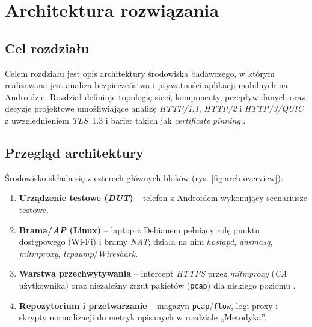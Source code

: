 \chapter{Architektura rozwiązania}

\section{Cel rozdziału}
Celem rozdziału jest opis architektury środowiska badawczego, w którym realizowana jest analiza bezpieczeństwa i prywatności aplikacji mobilnych na Androidzie. Rozdział definiuje topologię sieci, komponenty, przepływ danych oraz decyzje projektowe umożliwiające analizę \emph{HTTP/1.1}, \emph{HTTP/2} i \emph{HTTP/3/QUIC} z uwzględnieniem \emph{TLS}~1.3 i barier takich jak \emph{certificate pinning} \cite{RFC8446,RFC9113,RFC9114,RFC9000,OWASPMASTGIntercept,OWASPMASTGPinning}.

\section{Przegląd architektury}
Środowisko składa się z czterech głównych bloków (rys. \ref{fig:arch-overview}):
\begin{enumerate}
  \item \textbf{Urządzenie testowe (\emph{DUT})} – telefon z Androidem wykonujący scenariusze testowe.
  \item \textbf{Brama/\emph{AP} (Linux)} – laptop z Debianem pełniący rolę punktu dostępowego (Wi-Fi) i bramy \emph{NAT}; działa na nim \textit{hostapd}, \textit{dnsmasq}, \textit{mitmproxy}, \textit{tcpdump}/\textit{Wireshark}.
  \item \textbf{Warstwa przechwytywania} – intercept \emph{HTTPS} przez \textit{mitmproxy} (\emph{CA} użytkownika) oraz niezależny zrzut pakietów (\texttt{pcap}) dla niskiego poziomu \cite{MitmproxyDocs,WiresharkDocs,tcpdump}.
  \item \textbf{Repozytorium i przetwarzanie} – magazyn \texttt{pcap}/\texttt{flow}, logi proxy i skrypty normalizacji do metryk opisanych w rozdziale „Metodyka”.
\end{enumerate}


